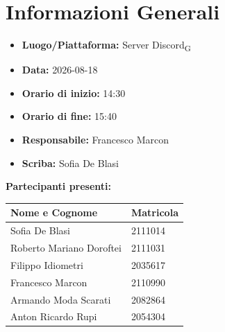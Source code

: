 
\section{Informazioni Generali}

\begin{itemize}

\item \textbf{Luogo/Piattaforma:} Server Discord\textsubscript{G}

\item \textbf{Data:} 2026-08-18

\item \textbf{Orario di inizio:} 14:30

\item \textbf{Orario di fine:} 15:40

\item \textbf{Responsabile:} Francesco Marcon

\item \textbf{Scriba:} Sofia De Blasi

\end{itemize}


\vspace{0.5cm}

\textbf{Partecipanti presenti:}

\begin{table}[ht]

\centering

\renewcommand{\arraystretch}{1.2}

\begin{tabularx}{\textwidth}{X l}

\toprule

\textbf{Nome e Cognome} & \textbf{Matricola} \\

\midrule

Sofia De Blasi & 2111014 \\

Roberto Mariano Doroftei & 2111031 \\

Filippo Idiometri & 2035617 \\

Francesco Marcon & 2110990 \\

Armando Moda Scarati & 2082864 \\

Anton Ricardo Rupi & 2054304 \\

\bottomrule

\end{tabularx}

\end{table}


